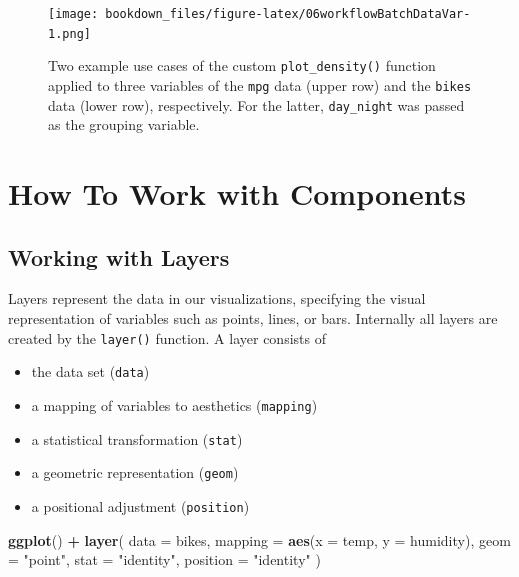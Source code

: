 \documentclass[
]{krantz}
\makeatletter
\newenvironment{Shaded}{\begin{snugshade}}{\end{snugshade}}
\newcommand{\AttributeTok}[1]{\textcolor[rgb]{0.27,0.27,0.27}{#1}}
\newcommand{\FunctionTok}[1]{\textcolor[rgb]{0.27,0.27,0.27}{\textbf{#1}}}
\newcommand{\NormalTok}[1]{#1}
\newcommand{\SpecialCharTok}[1]{\textcolor[rgb]{0.43,0.43,0.43}{\textbf{#1}}}
\newcommand{\StringTok}[1]{\textcolor[rgb]{0.5,0.5,0.5}{#1}}
\providecommand{\tightlist}{%
  \setlength{\itemsep}{0pt}\setlength{\parskip}{0pt}}
\newenvironment{kframe}{%
\medskip{}
\setlength{\fboxsep}{.8em}
 \def\at@end@of@kframe{}%
 \ifinner\ifhmode%
  \def\at@end@of@kframe{\end{minipage}}%
  \begin{minipage}{\columnwidth}%
 \fi\fi%
 \def\FrameCommand##1{\hskip\@totalleftmargin \hskip-\fboxsep
 \colorbox{shadecolor}{##1}\hskip-\fboxsep
     \hskip-\linewidth \hskip-\@totalleftmargin \hskip\columnwidth}%
 \MakeFramed {\advance\hsize-\width
   \@totalleftmargin\z@ \linewidth\hsize
   \@setminipage}}%
 {\par\unskip\endMakeFramed%
 \at@end@of@kframe}
\renewenvironment{Shaded}{\begin{kframe}}{\end{kframe}}
\makeatother
\begin{document}
\begin{figure}
\centering
\texttt{[image: bookdown\_files/figure-latex/06workflowBatchDataVar-1.png]}
\caption{\label{fig:06workflowBatchDataVar}Two example use cases of the custom \texttt{plot\_density()} function applied to three variables of the \texttt{mpg} data (upper row) and the \texttt{bikes} data (lower row), respectively. For the latter, \texttt{day\_night} was passed as the grouping variable.}
\end{figure}

\hypertarget{part-how-to-work-with-components}{%
\part{How To Work with Components}\label{part-how-to-work-with-components}}

\hypertarget{working-with-layers}{%
\chapter{Working with Layers}\label{working-with-layers}}

Layers represent the data in our visualizations, specifying the visual representation of variables such as points, lines, or bars. Internally all layers are created by the \texttt{layer()} function. A layer consists of

\begin{itemize}
\tightlist
\item
  the data set (\texttt{data})
\item
  a mapping of variables to aesthetics (\texttt{mapping})
\item
  a statistical transformation (\texttt{stat})
\item
  a geometric representation (\texttt{geom})
\item
  a positional adjustment (\texttt{position})
\end{itemize}

\begin{Shaded}
\begin{Highlighting}[]
\FunctionTok{ggplot}\NormalTok{() }\SpecialCharTok{+}
  \FunctionTok{layer}\NormalTok{(}
    \AttributeTok{data =}\NormalTok{ bikes, }
    \AttributeTok{mapping =} \FunctionTok{aes}\NormalTok{(}\AttributeTok{x =}\NormalTok{ temp, }\AttributeTok{y =}\NormalTok{ humidity),}
    \AttributeTok{geom =} \StringTok{"point"}\NormalTok{, }
    \AttributeTok{stat =} \StringTok{"identity"}\NormalTok{, }
    \AttributeTok{position =} \StringTok{"identity"}
\NormalTok{  )}
\end{Highlighting}
\end{Shaded}
\end{document}
